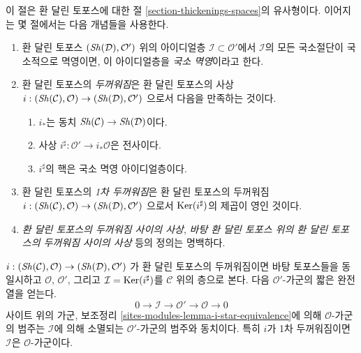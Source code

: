 \noindent
이 절은 환 달린 토포스에 대한 절 \ref{section-thickenings-spaces}의
유사형이다. 이어지는 몇 절에서는 다음 개념들을 사용한다.
\begin{enumerate}
\item 환 달린 토포스 $(\mathop{\mathit{Sh}}\nolimits(\mathcal{D}), \mathcal{O}')$ 위의 아이디얼층
$\mathcal{I} \subset \mathcal{O}'$에서 $\mathcal{I}$의 모든 국소절단이
국소적으로 멱영이면, 이 아이디얼층을 {\it 국소 멱영}이라고 한다.
\item 환 달린 토포스의 {\it 두꺼워짐}은 환 달린 토포스의 사상
$i : (\mathop{\mathit{Sh}}\nolimits(\mathcal{C}), \mathcal{O}) \to (\mathop{\mathit{Sh}}\nolimits(\mathcal{D}), \mathcal{O}')$
으로서 다음을 만족하는 것이다.
\begin{enumerate}
\item $i_*$는 동치 $\mathop{\mathit{Sh}}\nolimits(\mathcal{C}) \to \mathop{\mathit{Sh}}\nolimits(\mathcal{D})$이다.
\item 사상 $i^\sharp : \mathcal{O}' \to i_*\mathcal{O}$은 전사이다.
\item $i^\sharp$의 핵은 국소 멱영 아이디얼층이다.
\end{enumerate}
\item 환 달린 토포스의 {\it 1차 두꺼워짐}은 환 달린 토포스의 두꺼워짐
$i : (\mathop{\mathit{Sh}}\nolimits(\mathcal{C}), \mathcal{O}) \to (\mathop{\mathit{Sh}}\nolimits(\mathcal{D}), \mathcal{O}')$
으로서 $\mathop{\mathrm{Ker}}(i^\sharp)$의 제곱이 영인 것이다.
\item {\it 환 달린 토포스의 두꺼워짐 사이의 사상},
{\it 바탕 환 달린 토포스 위의 환 달린 토포스의 두꺼워짐 사이의 사상}
등의 정의는 명백하다.
\end{enumerate}
$i : (\mathop{\mathit{Sh}}\nolimits(\mathcal{C}), \mathcal{O}) \to (\mathop{\mathit{Sh}}\nolimits(\mathcal{D}), \mathcal{O}')$
가 환 달린 토포스의 두꺼워짐이면 바탕 토포스들을 동일시하고
$\mathcal{O}$, $\mathcal{O}'$, 그리고
$\mathcal{I} = \mathop{\mathrm{Ker}}(i^\sharp)$를 $\mathcal{C}$ 위의 층으로 본다.
다음 $\mathcal{O}'$-가군의 짧은 완전열을 얻는다.
$$
0 \to \mathcal{I} \to \mathcal{O}' \to \mathcal{O} \to 0
$$
사이트 위의 가군, 보조정리
\ref{sites-modules-lemma-i-star-equivalence}에 의해
$\mathcal{O}$-가군의 범주는 $\mathcal{I}$에 의해 소멸되는
$\mathcal{O}'$-가군의 범주와 동치이다. 특히 $i$가 1차 두꺼워짐이면
$\mathcal{I}$은 $\mathcal{O}$-가군이다.

